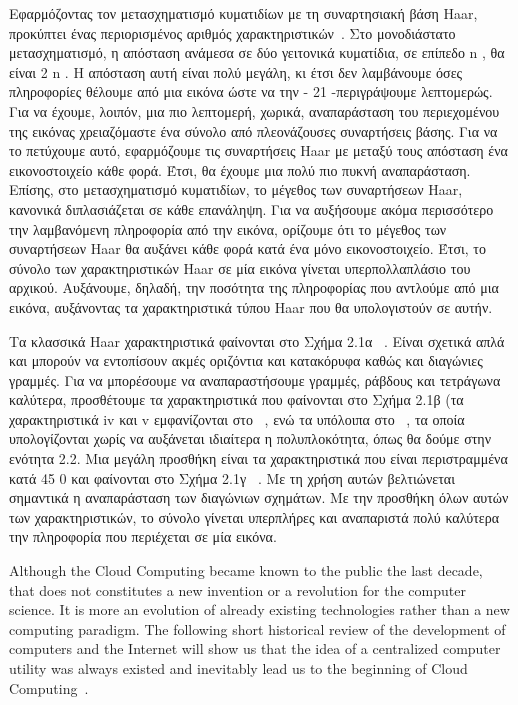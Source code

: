 Εφαρμόζοντας τον μετασχηματισμό κυματιδίων με τη συναρτησιακή βάση Haar, προκύπτει
ένας περιορισμένος αριθμός χαρακτηριστικών~\cite{OrePapSinOsu97}. Στο μονοδιάστατο μετασχηματισμό, η
απόσταση ανάμεσα σε δύο γειτονικά κυματίδια, σε επίπεδο n , θα είναι 2 n . Η απόσταση αυτή είναι
πολύ μεγάλη, κι έτσι δεν λαμβάνουμε όσες πληροφορίες θέλουμε από μια εικόνα ώστε να την
- 21 -περιγράψουμε λεπτομερώς. Για να έχουμε, λοιπόν, μια πιο λεπτομερή, χωρικά, αναπαράσταση του
περιεχομένου της εικόνας χρειαζόμαστε ένα σύνολο από πλεονάζουσες συναρτήσεις βάσης. Για να
το πετύχουμε αυτό, εφαρμόζουμε τις συναρτήσεις Haar με μεταξύ τους απόσταση ένα
εικονοστοιχείο κάθε φορά. Έτσι, θα έχουμε μια πολύ πιο πυκνή αναπαράσταση. Επίσης, στο
μετασχηματισμό κυματιδίων, το μέγεθος των συναρτήσεων Haar, κανονικά διπλασιάζεται σε κάθε
επανάληψη. Για να αυξήσουμε ακόμα περισσότερο την λαμβανόμενη πληροφορία από την εικόνα,
ορίζουμε ότι το μέγεθος των συναρτήσεων Haar θα αυξάνει κάθε φορά κατά ένα μόνο
εικονοστοιχείο. Έτσι, το σύνολο των χαρακτηριστικών Haar σε μία εικόνα γίνεται
υπερπολλαπλάσιο του αρχικού. Αυξάνουμε, δηλαδή, την ποσότητα της πληροφορίας που αντλούμε
από μια εικόνα, αυξάνοντας τα χαρακτηριστικά τύπου Haar που θα υπολογιστούν σε αυτήν.

Τα κλασσικά Haar χαρακτηριστικά φαίνονται στο Σχήμα 2.1α ~\cite{OrePapSinOsu97}. Είναι σχετικά απλά
και μπορούν να εντοπίσουν ακμές οριζόντια και κατακόρυφα καθώς και διαγώνιες γραμμές. Για να
μπορέσουμε να αναπαραστήσουμε γραμμές, ράβδους και τετράγωνα καλύτερα, προσθέτουμε τα
χαρακτηριστικά που φαίνονται στο Σχήμα 2.1β (τα χαρακτηριστικά iv και v εμφανίζονται στο
~\cite{Viola01rapidobject}, ενώ τα υπόλοιπα στο ~\cite{Lienhart02anextended},
τα οποία υπολογίζονται χωρίς να αυξάνεται ιδιαίτερα η
πολυπλοκότητα, όπως θα δούμε στην ενότητα 2.2. Μια μεγάλη προσθήκη είναι τα χαρακτηριστικά
που είναι περιστραμμένα κατά 45 0 και φαίνονται στο Σχήμα 2.1γ ~\cite{Lienhart02anextended}. Με τη χρήση αυτών
βελτιώνεται σημαντικά η αναπαράσταση των διαγώνιων σχημάτων. Με την προσθήκη όλων αυτών
των χαρακτηριστικών, το σύνολο γίνεται υπερπλήρες και αναπαριστά πολύ καλύτερα την
πληροφορία που περιέχεται σε μία εικόνα.

Although the Cloud Computing became known to the public the last decade, that
does not constitutes a new invention or a revolution for the computer science.
It is more an evolution of already existing technologies rather than a new
computing paradigm. The following short historical review of the development of
computers and the Internet will show us that the idea of a centralized computer
utility was always existed and inevitably lead us to the beginning of Cloud
Computing~\cite{cloud_evolution}.


